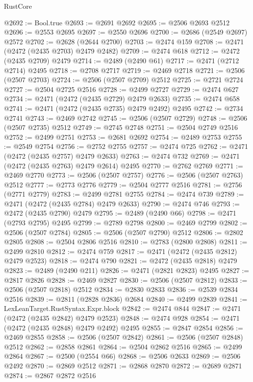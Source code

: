 \begin{lexlean}{RustCore}
\begin{coremodule}
@2692 := Bool.true
@2693 := @2691 @2692
@2695 := @2506 @2693 @2512
@2696 := @2553 @2695
@2697 := @2550 @2696
@2700 := @2686 (@2549 @2697) @2572
@2702 := @2628 (@2644 @2700)
@2703 := @2474 @159
@2708 := @2471 (@2472 (@2435 @2703) @2479 @2482)
@2709 := @2474 @618
@2712 := @2472 (@2435 @2709) @2479
@2714 := @2489 (@2490 @61)
@2717 := @2471 (@2712 @2714) @2495
@2718 := @2708 @2717
@2719 := @2469 @2718
@2721 := @2506 (@2507 @2703)
@2724 := @2506 (@2507 @2709) @2512
@2725 := @2721 @2724
@2727 := @2504 @2725 @2516
@2728 := @2499 @2727
@2729 := @2474 @627
@2734 := @2471 (@2472 (@2435 @2729) @2479 @2633)
@2735 := @2474 @658
@2741 := @2471 (@2472 (@2435 @2735) @2479 @2492) @2495
@2742 := @2734 @2741
@2743 := @2469 @2742
@2745 := @2506 (@2507 @2729)
@2748 := @2506 (@2507 @2735) @2512
@2749 := @2745 @2748
@2751 := @2504 @2749 @2516
@2752 := @2499 @2751
@2753 := @2681 @2692
@2754 := @2489 @2753
@2755 := @2549 @2754
@2756 := @2752 @2755
@2757 := @2474 @725
@2762 := @2471 (@2472 (@2435 @2757) @2479 @2633)
@2763 := @2474 @732
@2769 := @2471 (@2472 (@2435 @2763) @2479 @2614) @2495
@2770 := @2762 @2769
@2771 := @2469 @2770
@2773 := @2506 (@2507 @2757)
@2776 := @2506 (@2507 @2763) @2512
@2777 := @2773 @2776
@2779 := @2504 @2777 @2516
@2781 := @2756 (@2771 @2779)
@2783 := @2499 @2781 @2755
@2784 := @2474 @739
@2789 := @2471 (@2472 (@2435 @2784) @2479 @2633)
@2790 := @2474 @746
@2793 := @2472 (@2435 @2790) @2479
@2795 := @2489 (@2490 @66)
@2798 := @2471 (@2793 @2795) @2495
@2799 := @2789 @2798
@2800 := @2469 @2799
@2802 := @2506 (@2507 @2784)
@2805 := @2506 (@2507 @2790) @2512
@2806 := @2802 @2805
@2808 := @2504 @2806 @2516
@2810 := @2783 (@2800 @2808)
@2811 := @2499 @2810
@2812 := @2474 @759
@2817 := @2471 (@2472 (@2435 @2812) @2479 @2523)
@2818 := @2474 @790
@2821 := @2472 (@2435 @2818) @2479
@2823 := @2489 (@2490 @211)
@2826 := @2471 (@2821 @2823) @2495
@2827 := @2817 @2826
@2828 := @2469 @2827
@2830 := @2506 (@2507 @2812)
@2833 := @2506 (@2507 @2818) @2512
@2834 := @2830 @2833
@2836 := @2539 @2834 @2516
@2839 := @2811 (@2828 @2836) @2684
@2840 := @2499 @2839
@2841 := LexLeanTarget.RustSyntax.Expr.block
@2842 := @2474 @844
@2847 := @2471 (@2472 (@2435 @2842) @2479 @2523)
@2848 := @2474 @928
@2854 := @2471 (@2472 (@2435 @2848) @2479 @2492) @2495
@2855 := @2847 @2854
@2856 := @2469 @2855
@2858 := @2506 (@2507 @2842)
@2861 := @2506 (@2507 @2848) @2512
@2862 := @2858 @2861
@2864 := @2504 @2862 @2516
@2865 := @2499 @2864
@2867 := @2500 (@2554 @66)
@2868 := @2506 @2633
@2869 := @2506 @2492
@2870 := @2869 @2512
@2871 := @2868 @2870
@2872 := @2689 @2871
@2874 := @2867 @2872 @2516

\end{coremodule}
\end{lexlean}
